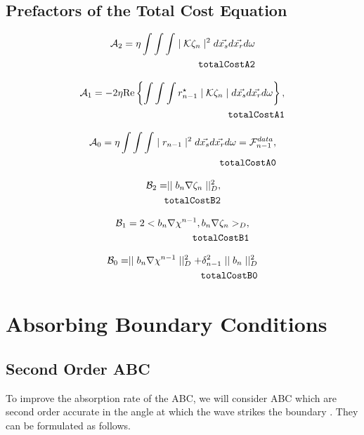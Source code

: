 \documentclass[10pt,a4paper]{article}
\newcommand{\real}[1]{\text{Re} \left\{ #1 \right\}}
\begin{document}
{\subsection{Prefactors of the Total Cost Equation}
\label{totalcostprefactors}
\begin{align} \label{eq:totalCostA2} \mathcal{A}_2 = \eta \int \int \int
\mid \mathcal{K} \zeta_n \mid^2 d\vec{x_s}d\vec{x_r}d\omega\\
\tag*{\texttt{totalCostA2}}
\end{align}

\begin{align} \label{eq:totalCostA1} \mathcal{A}_1 = -2 \eta \real{\int
\int \int r^{\star}_{n-1} \mid \mathcal{K} \zeta_n \mid
d\vec{x_s}d\vec{x_r}d\omega} , \\
\tag*{\texttt{totalCostA1}}
\end{align}

\begin{align} \label{eq:totalCostA0} \mathcal{A}_0 = \eta \int \int \int
\mid r_{n-1} \mid^2 d\vec{x_s}d\vec{x_r}d\omega =
\mathcal{F}^{data}_{n-1} , \\
\tag*{\texttt{totalCostA0}}
 \end{align}

\begin{align} \label{eq:totalCostB2} \mathcal{B}_2 = \mid \mid b_n \nabla
\zeta_n \mid \mid^{2}_D ,\\
\tag*{\texttt{totalCostB2}}
\end{align}

\begin{align} \label{eq:totalCostB1} \mathcal{B}_1 = 2 < b_n
\nabla\chi^{n-1}, b_n \nabla \zeta_n >_D, \\
\tag*{\texttt{totalCostB1}}
\end{align}

\begin{align} \label{eq:totalCostB0} \mathcal{B}_0 = \mid \mid b_n \nabla
\chi^{n-1} \mid \mid^{2}_D + \delta^{2}_{n-1} \mid \mid b_n \mid
\mid^{2}_D\\
\tag*{\texttt{totalCostB0}}
\end{align}

\section{Absorbing Boundary Conditions}\label{sec:ABC}
\subsection{Second Order ABC}
To improve the absorption rate of the ABC, we will consider ABC which are second order accurate in the angle at which the wave strikes the boundary \cite{AbsorpationRates}. They can be formulated as follows.

}
\end{document}
